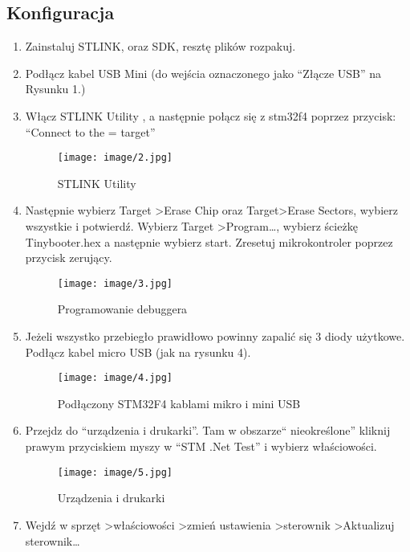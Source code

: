 \documentclass{article}
\begin{document}
\subsection{Konfiguracja}
\begin{enumerate}
\item Zainstaluj STLINK, oraz SDK, resztę plików rozpakuj.
\item Podłącz kabel USB Mini (do wejścia oznaczonego jako “Złącze USB” na Rysunku 1.)
\item Włącz STLINK Utility , a następnie połącz się z stm32f4 poprzez przycisk: “Connect to the = target”

\begin{figure}[H]
\texttt{[image: image/2.jpg]}
\caption{STLINK Utility}
\end{figure}

\item Następnie wybierz Target \textgreater Erase Chip oraz Target\textgreater Erase Sectors, wybierz wszystkie i potwierdź. Wybierz Target \textgreater Program…, wybierz ścieżkę Tinybooter.hex a następnie wybierz start. Zresetuj mikrokontroler poprzez przycisk zerujący.

\begin{figure}[H]
\texttt{[image: image/3.jpg]}
\caption{Programowanie debuggera}
\end{figure}

\item Jeżeli wszystko przebiegło prawidłowo powinny zapalić się 3 diody użytkowe. Podłącz kabel micro USB (jak na rysunku 4).

\begin{figure}[H]
\texttt{[image: image/4.jpg]}
\caption{Podłączony STM32F4 kablami mikro i mini USB}
\end{figure}

\item Przejdz do “urządzenia i drukarki”. Tam w obszarze“ nieokreślone” kliknij prawym przyciskiem myszy w “STM .Net Test” i wybierz właściowości.

\begin{figure}[H]
\texttt{[image: image/5.jpg]}
\caption{Urządzenia i drukarki}
\end{figure}

\item Wejdź w sprzęt \textgreater właściowości \textgreater zmień ustawienia \textgreater sterownik \textgreater Aktualizuj sterownik…


\end{enumerate}
\end{document}
